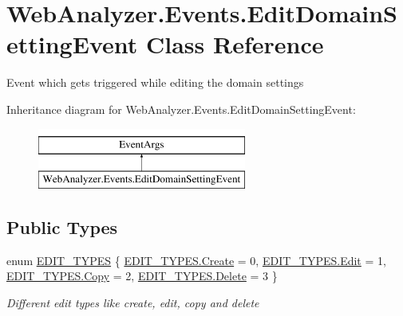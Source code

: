 \hypertarget{class_web_analyzer_1_1_events_1_1_edit_domain_setting_event}{}\section{Web\+Analyzer.\+Events.\+Edit\+Domain\+Setting\+Event Class Reference}
\label{class_web_analyzer_1_1_events_1_1_edit_domain_setting_event}


Event which gets triggered while editing the domain settings  


Inheritance diagram for Web\+Analyzer.\+Events.\+Edit\+Domain\+Setting\+Event\+:\begin{figure}[H]
\begin{center}
\leavevmode
\includegraphics[height=2.000000cm]{class_web_analyzer_1_1_events_1_1_edit_domain_setting_event}
\end{center}
\end{figure}
\subsection*{Public Types}
\begin{DoxyCompactItemize}
\item 
enum \hyperlink{class_web_analyzer_1_1_events_1_1_edit_domain_setting_event_a1a22be020f4b06370ab3a64893272b44}{E\+D\+I\+T\+\_\+\+T\+Y\+P\+E\+S} \{ \hyperlink{class_web_analyzer_1_1_events_1_1_edit_domain_setting_event_a1a22be020f4b06370ab3a64893272b44a686e697538050e4664636337cc3b834f}{E\+D\+I\+T\+\_\+\+T\+Y\+P\+E\+S.\+Create} = 0, 
\hyperlink{class_web_analyzer_1_1_events_1_1_edit_domain_setting_event_a1a22be020f4b06370ab3a64893272b44a7dce122004969d56ae2e0245cb754d35}{E\+D\+I\+T\+\_\+\+T\+Y\+P\+E\+S.\+Edit} = 1, 
\hyperlink{class_web_analyzer_1_1_events_1_1_edit_domain_setting_event_a1a22be020f4b06370ab3a64893272b44a5fb63579fc981698f97d55bfecb213ea}{E\+D\+I\+T\+\_\+\+T\+Y\+P\+E\+S.\+Copy} = 2, 
\hyperlink{class_web_analyzer_1_1_events_1_1_edit_domain_setting_event_a1a22be020f4b06370ab3a64893272b44af2a6c498fb90ee345d997f888fce3b18}{E\+D\+I\+T\+\_\+\+T\+Y\+P\+E\+S.\+Delete} = 3
 \}\begin{DoxyCompactList}\small\item\em Different edit types like create, edit, copy and delete \end{DoxyCompactList}
\end{DoxyCompactItemize}
